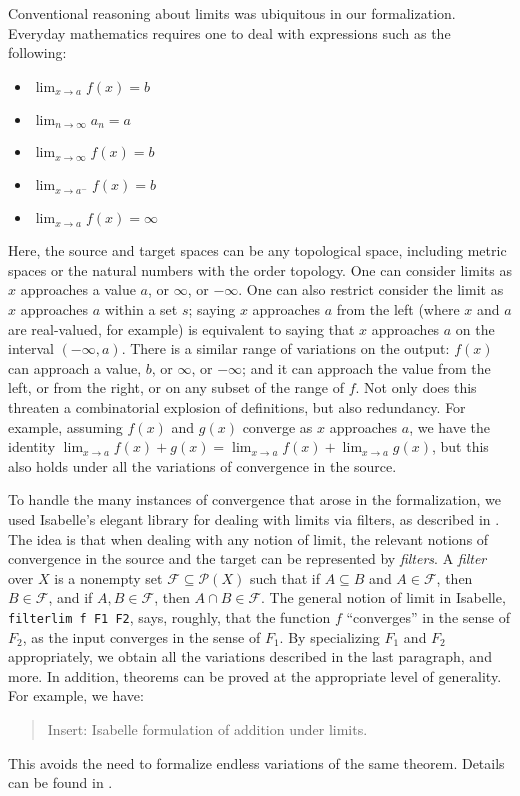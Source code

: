 \documentclass{svjour3}
\newcommand{\todo}[1]{{\color{red}#1}}
\begin{document}
Conventional reasoning about limits was ubiquitous in our formalization. Everyday mathematics requires one to deal with expressions such as the following:
\begin{itemize}
 \item $\lim_{x \to a} f(x) = b$
 \item $\lim_{n \to \infty} a_n = a$
 \item $\lim_{x \to \infty} f(x) = b$
 \item $\lim_{x \to a^-} f(x) = b$
 \item $\lim_{x \to a} f(x) = \infty$
\end{itemize}
Here, the source and target spaces can be any topological space, including metric spaces or the natural numbers with the order topology. One can consider limits as $x$ approaches a value $a$, or $\infty$, or $-\infty$. One can also restrict consider the limit as $x$ approaches $a$ within a set $s$; saying $x$ approaches $a$ from the left (where $x$ and $a$ are real-valued, for example) is equivalent to saying that $x$ approaches $a$ on the interval $(-\infty, a)$. There is a similar range of variations on the output: $f(x)$ can approach a value, $b$, or $\infty$, or $-\infty$; and it can approach the value from the left, or from the right, or on any subset of the range of $f$. Not only does this threaten a combinatorial explosion of definitions, but also redundancy. For example, assuming $f(x)$ and $g(x)$ converge as $x$ approaches $a$, we have the identity $\lim_{x \to a} f(x) + g(x) = \lim_{x \to a} f(x) + \lim_{x \to a} g(x)$, but this also holds under all the variations of convergence in the source.

To handle the many instances of convergence that arose in the formalization, we used Isabelle's elegant library for dealing with limits via filters, as described in \cite{hoelzl:et:al:13}. The idea is that when dealing with any notion of limit, the relevant notions of convergence in the source and the target can be represented by \emph{filters}. A {\em filter} over $X$ is a nonempty set $\mathcal F \subseteq \mathcal P(X)$ such that if $A \subseteq B$ and $A \in \mathcal F$, then $B \in \mathcal F$, and if $A, B \in \mathcal F$, then $A \cap B \in \mathcal F$. The general notion of limit in Isabelle, {\tt filterlim f F1 F2}, says, roughly, that the function $f$ ``converges'' in the sense of $F_2$, as the input converges in the sense of $F_1$. By specializing $F_1$ and $F_2$ appropriately, we obtain all the variations described in the last paragraph, and more. In addition, theorems can be proved at the appropriate level of generality. For example, we have:
\begin{quote}
 \todo{Insert: Isabelle formulation of addition under limits.}
\end{quote}
This avoids the need to formalize endless variations of the same theorem. Details can be found in \cite{hoelzl:et:al:13}.
\end{document}
